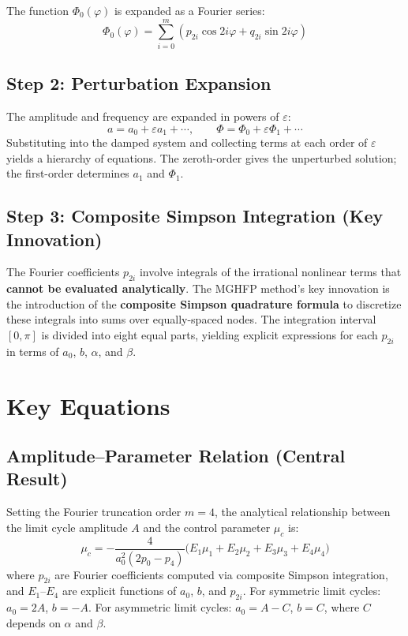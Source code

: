 \documentclass[11pt,a4paper]{article}
\begin{document}
The function $\Phi_0(\varphi)$ is expanded as a Fourier series:
\begin{equation}
\Phi_0(\varphi) = \sum_{i=0}^{m} \left(p_{2i}\cos 2i\varphi + q_{2i}\sin 2i\varphi\right)
\end{equation}

\subsection{Step 2: Perturbation Expansion}

The amplitude and frequency are expanded in powers of $\varepsilon$:
\begin{equation}
a = a_0 + \varepsilon a_1 + \cdots, \qquad \Phi = \Phi_0 + \varepsilon\Phi_1 + \cdots
\end{equation}
Substituting into the damped system and collecting terms at each order of $\varepsilon$ yields a hierarchy of equations. The zeroth-order gives the unperturbed solution; the first-order determines $a_1$ and $\Phi_1$.

\subsection{Step 3: Composite Simpson Integration (Key Innovation)}

The Fourier coefficients $p_{2i}$ involve integrals of the irrational nonlinear terms that \textbf{cannot be evaluated analytically}. The MGHFP method's key innovation is the introduction of the \textbf{composite Simpson quadrature formula} to discretize these integrals into sums over equally-spaced nodes. The integration interval $[0, \pi]$ is divided into eight equal parts, yielding explicit expressions for each $p_{2i}$ in terms of $a_0$, $b$, $\alpha$, and $\beta$.

\section{Key Equations}

\subsection{Amplitude--Parameter Relation (Central Result)}

Setting the Fourier truncation order $m=4$, the analytical relationship between the limit cycle amplitude $A$ and the control parameter $\mu_c$ is:
\begin{equation}
\boxed{\mu_c = -\frac{4}{a_0^2(2p_0 - p_4)}\Big(E_1\mu_1 + E_2\mu_2 + E_3\mu_3 + E_4\mu_4\Big)}
\label{eq:amplitude}
\end{equation}
where $p_{2i}$ are Fourier coefficients computed via composite Simpson integration, and $E_1$--$E_4$ are explicit functions of $a_0$, $b$, and $p_{2i}$. For symmetric limit cycles: $a_0 = 2A$, $b = -A$. For asymmetric limit cycles: $a_0 = A - C$, $b = C$, where $C$ depends on $\alpha$ and $\beta$.
\end{document}
